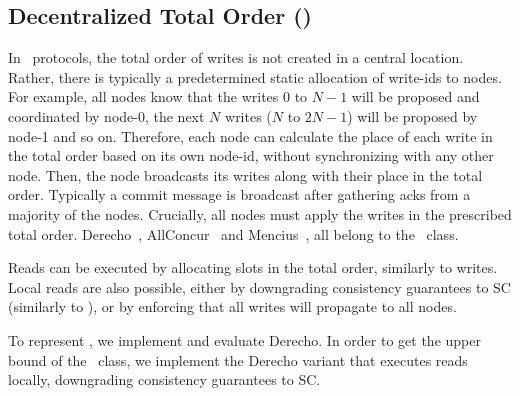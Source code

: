 \subsection{Decentralized Total Order (\DTO)}\label{sec:tax:dto}
In \DTO\ protocols, the total order of writes is not created in a central location. Rather, 
there is typically a predetermined static allocation of write-ids to nodes. For example, 
all nodes know that the writes $0$ to $N - 1$ will be proposed and coordinated by node-0, the next $N$ writes (\ie $N$ to $2N - 1$) will be proposed by node-1 and so on.
Therefore, each node can calculate the place of each write in the total order based on its own node-id, without synchronizing with any other node. Then, the node broadcasts its writes along with their place in the total order. Typically a commit message is broadcast after gathering acks from a majority of the nodes.
Crucially, all nodes must apply the writes in the prescribed total order.
Derecho~\cite{Jha:2019}, AllConcur~\cite{Poke:2017} and Mencius~\cite{Mao:2008}, all belong to the \DTO~class.

Reads can be executed 
by allocating slots in the total order, similarly to writes.
Local reads are also possible, either by downgrading consistency guarantees to SC (similarly to \LTO), or by enforcing that all writes will propagate to all nodes.

To represent \DTO, we implement and evaluate Derecho. In order to get the upper bound of the \DTO~class, we implement the Derecho variant that executes reads locally, downgrading consistency guarantees to SC.

